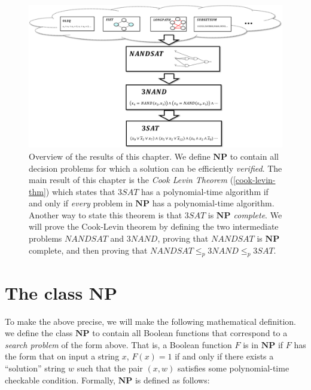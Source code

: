 \begin{figure}
\centering
\includegraphics[width=\textwidth, height=0.25\paperheight, keepaspectratio]{../figure/cooklevin_overview.png}
\caption{Overview of the results of this chapter. We define
\(\mathbf{NP}\) to contain all decision problems for which a solution
can be efficiently \emph{verified}. The main result of this chapter is
the \emph{Cook Levin Theorem} (\cref{cook-levin-thm}) which states that
\(3\ensuremath{\mathit{SAT}}\) has a polynomial-time algorithm if and
only if \emph{every} problem in \(\mathbf{NP}\) has a polynomial-time
algorithm. Another way to state this theorem is that
\(3\ensuremath{\mathit{SAT}}\) is \emph{\(\mathbf{NP}\) complete}. We
will prove the Cook-Levin theorem by defining the two intermediate
problems \(\ensuremath{\mathit{NANDSAT}}\) and
\(3\ensuremath{\mathit{NAND}}\), proving that
\(\ensuremath{\mathit{NANDSAT}}\) is \(\mathbf{NP}\) complete, and then
proving that
\(\ensuremath{\mathit{NANDSAT}} \leq_p 3\ensuremath{\mathit{NAND}} \leq_p 3\ensuremath{\mathit{SAT}}\).}
\label{cooklevin_overviewfig}
\end{figure}

\section{The class \(\mathbf{NP}\)}\label{The-class-mathbfNP}

To make the above precise, we will make the following mathematical
definition. we define the class \(\mathbf{NP}\) to contain all Boolean
functions that correspond to a \emph{search problem} of the form above.
That is, a Boolean function \(F\) is in \(\mathbf{NP}\) if \(F\) has the
form that on input a string \(x\), \(F(x)=1\) if and only if there
exists a ``solution'' string \(w\) such that the pair \((x,w)\)
satisfies some polynomial-time checkable condition. Formally,
\(\mathbf{NP}\) is defined as follows:


